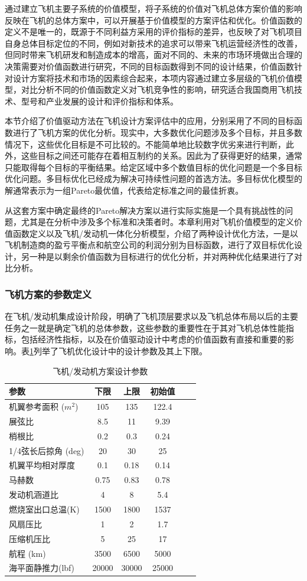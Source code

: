 \documentclass[12pt,a4paper]{report}
\begin{document}
通过建立飞机主要子系统的价值模型，将子系统的价值对飞机总体方案价值的影响反映在飞机的总体方案中，可以开展基于价值模型的方案评估和优化。价值函数的定义不是唯一的，既源于不同利益方采用的评价指标的差异，也反映了对飞机项目自身总体目标定位的不同，例如对新技术的追求可以带来飞机运营经济性的改善，但同时带来飞机研发和制造成本的增高，面对不同的、未来的市场环境做出合理的决策需要对价值函数进行研究，不同的目标函数得到不同的设计结果，价值函数针对设计方案将技术和市场的因素综合起来，本项内容通过建立多层级的飞机价值模型，对比分析不同的价值函数定义对飞机竞争性的影响，研究适合我国商用飞机技术、型号和产业发展的设计和评价指标和体系。

本节介绍了价值驱动方法在飞机设计方案评估中的应用，分别采用了不同的目标函数进行了飞机方案的优化分析。现实中，大多数优化问题涉及多个目标，并且多数情况下，这些优化目标是不可比较的。不能简单地比较数字优劣来进行判断，此外，这些目标之间还可能存在着相互制约的关系。因此为了获得更好的结果，通常只能取得每个目标的平衡结果。给定区域中多个数值目标的优化问题是一个多目标优化问题。多目标优化已经成为解决可持续性问题的首选方法。多目标优化模型的解通常表示为一组Pareto最优值，代表给定标准之间的最佳折衷。

从这套方案中确定最终的Pareto解决方案以进行实际实施是一个具有挑战性的问题，尤其是在分析中涉及多个标准和决策者时。本章利用对飞机价值模型的定义价值函数定义以及飞机/发动机一体化分析模型，介绍了两种设计优化方法，一是以飞机制造商的盈亏平衡点和航空公司的利润分别为目标函数，进行了双目标优化设计，另一种是以剩余价值函数为目标进行的优化分析，并对两种优化结果进行了对比分析。

\subsubsection{飞机方案的参数定义}

在飞机/发动机集成设计阶段，明确了飞机顶层要求以及飞机总体布局以后的主要任务之一就是确定飞机的总体参数，这些参数的重要性在于其对飞机总体性能指标，包括经济性指标，以及在价值驱动设计中考虑的价值函数有直接和重要的影响。表\ref{tab:designtable}列举了飞机优化设计中的设计参数及其上下限。
\begin{table}[!htp]
\caption{飞机/发动机方案设计参数}
\label{tab:designtable}
\centering
\begin{tabular}{lccccc}
\hline \hline
参数& 下限&上限&初始值\\\hline
机翼参考面积 ($m^2$)& 105 & 135  & 122.4\\
展弦比&8.5&11&9.39\\
梢根比&0.2&0.3&0.24\\
1/4弦长后掠角 (deg)&20&30&25\\
机翼平均相对厚度&0.1&0.18&0.14\\
马赫数& 0.75&0.83&0.78\\
发动机涵道比& 4&8&5.4\\
燃烧室出口总温(K) & 1500& 1800&1537\\
风扇压比 & 1 &2&1.7\\
压缩机压比 & 5&25 &17\\
航程 (km)&3500&6500&5000\\
海平面静推力(lbf)&20000&30000&25000\\\hline
\hline
\end{tabular}
\end{table}
\end{document}
